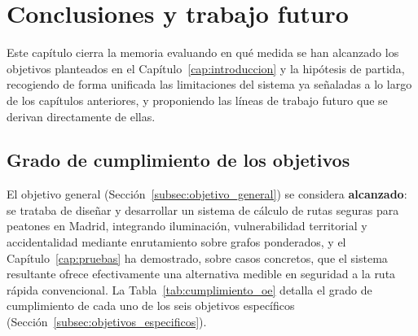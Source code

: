 \chapter{Conclusiones y trabajo futuro}
\label{cap:conclusiones}

Este capítulo cierra la memoria evaluando en qué medida se han alcanzado los objetivos planteados en el Capítulo~\ref{cap:introduccion} y la hipótesis de partida, recogiendo de forma unificada las limitaciones del sistema ya señaladas a lo largo de los capítulos anteriores, y proponiendo las líneas de trabajo futuro que se derivan directamente de ellas.

\section{Grado de cumplimiento de los objetivos}
\label{sec:cumplimiento_objetivos}

El objetivo general (Sección~\ref{subsec:objetivo_general}) se considera \textbf{alcanzado}: se trataba de diseñar y desarrollar un sistema de cálculo de rutas seguras para peatones en Madrid, integrando iluminación, vulnerabilidad territorial y accidentalidad mediante enrutamiento sobre grafos ponderados, y el Capítulo~\ref{cap:pruebas} ha demostrado, sobre casos concretos, que el sistema resultante ofrece efectivamente una alternativa medible en seguridad a la ruta rápida convencional. La Tabla~\ref{tab:cumplimiento_oe} detalla el grado de cumplimiento de cada uno de los seis objetivos específicos (Sección~\ref{subsec:objetivos_especificos}).

